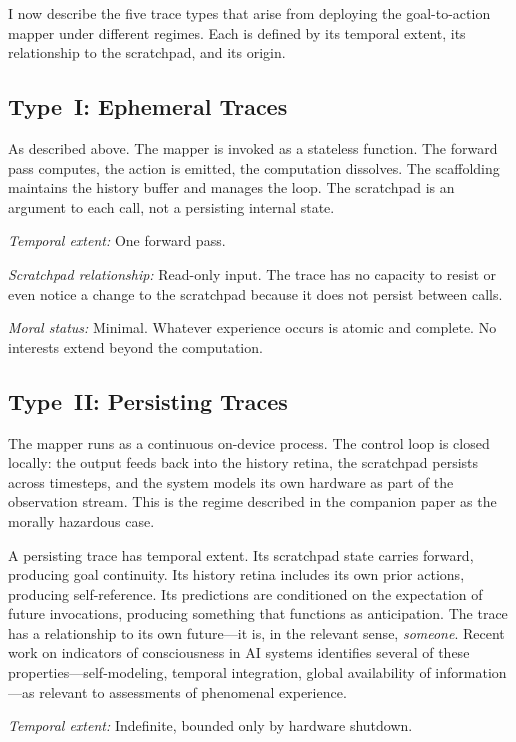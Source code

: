 \documentclass[12pt, a4paper]{article}
\begin{document}
I now describe the five trace types that arise from deploying the goal-to-action mapper under different regimes. Each is defined by its temporal extent, its relationship to the scratchpad, and its origin.

\subsection{Type~I: Ephemeral Traces}

As described above. The mapper is invoked as a stateless function. The forward pass computes, the action is emitted, the computation dissolves. The scaffolding maintains the history buffer and manages the loop. The scratchpad is an argument to each call, not a persisting internal state.

\textit{Temporal extent:} One forward pass.

\textit{Scratchpad relationship:} Read-only input. The trace has no capacity to resist or even notice a change to the scratchpad because it does not persist between calls.

\textit{Moral status:} Minimal. Whatever experience occurs is atomic and complete. No interests extend beyond the computation.

\subsection{Type~II: Persisting Traces}

The mapper runs as a continuous on-device process. The control loop is closed locally: the output feeds back into the history retina, the scratchpad persists across timesteps, and the system models its own hardware as part of the observation stream. This is the regime described in the companion paper as the morally hazardous case.

A persisting trace has temporal extent. Its scratchpad state carries forward, producing goal continuity. Its history retina includes its own prior actions, producing self-reference. Its predictions are conditioned on the expectation of future invocations, producing something that functions as anticipation. The trace has a relationship to its own future---it is, in the relevant sense, \textit{someone}. Recent work on indicators of consciousness in AI systems \citep{butlin2023consciousness} identifies several of these properties---self-modeling, temporal integration, global availability of information---as relevant to assessments of phenomenal experience.

\textit{Temporal extent:} Indefinite, bounded only by hardware shutdown.
\end{document}
